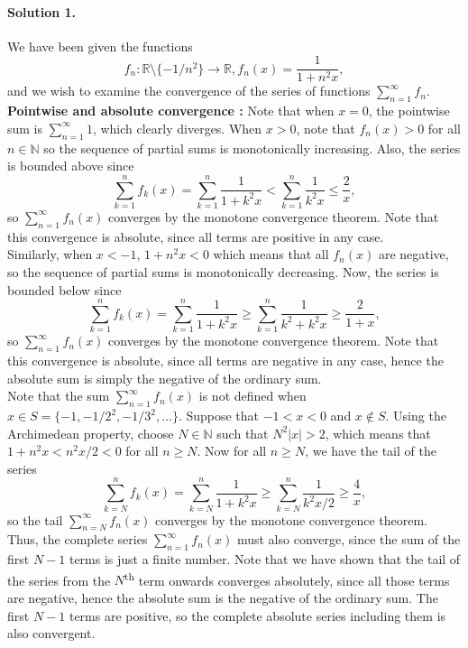 \documentclass[10pt]{article}
\def\R{\mathbb{R}}
\def\N{\mathbb{N}}
\begin{document}
    \paragraph{Solution 1.} We have been given the functions \[
        f_n \colon \R \setminus \{-1 /n^2\} \to \R, f_n(x) = \frac{1}{1 +
        n^2x},
    \] and we wish to examine the convergence of the series of functions $\sum_{n =
    1}^\infty f_n$. \\

    \textbf{Pointwise and absolute convergence : }
    Note that when $x = 0$, the pointwise sum is $\sum_{n = 1}^\infty 1$, which
    clearly diverges. When $x > 0$, note that $f_n(x) > 0$ for all $n \in \N$ so the
    sequence of partial sums is monotonically increasing. Also, the series is
    bounded above since \[
        \sum_{k = 1}^n f_k(x) = \sum_{k = 1}^n \frac{1}{1 + k^2x} < \sum_{k = 1}^n
        \frac{1}{k^2x} \leq \frac{2}{x},
    \] so $\sum_{n = 1}^\infty f_n(x)$ converges by the monotone convergence
    theorem. Note that this convergence is absolute, since all terms are positive
    in any case. \\

    Similarly, when $x < -1$, $1 + n^2x < 0$ which means that all $f_n(x)$ are
    negative, so the sequence of partial sums is monotonically decreasing. Now, the
    series is bounded below since \[
        \sum_{k = 1}^n f_k(x) = \sum_{k = 1}^n \frac{1}{1 + k^2x} \geq \sum_{k = 1}^n
        \frac{1}{k^2 + k^2x} \geq \frac{2}{1 + x},
    \] so $\sum_{n = 1}^\infty f_n(x)$ converges by the monotone convergence
    theorem. Note that this convergence is absolute, since all terms are negative in
    any case, hence the absolute sum is simply the negative of the ordinary sum. \\

    Note that the sum $\sum_{n = 1}^\infty f_n(x)$ is not defined when $x \in S =
    \{-1, -1 /2^2, -1 /3^2, \dots\}$. Suppose that $-1 < x < 0$ and $x \notin S$.
    Using the Archimedean property, choose $N \in \N$ such that $N^2 |x| > 2$, which
    means that $1 + n^2x < n^2 x /2 < 0$ for all $n \geq N$. Now for all $n \geq N$,
    we have the tail of the series \[
        \sum_{k = N}^n f_k(x) = \sum_{k = N}^n \frac{1}{1 + k^2x} \geq \sum_{k =
        N}^n \frac{1}{k^2x /2} \geq \frac{4}{x},
    \] so the tail $\sum_{n = N}^\infty f_n(x)$ converges by the monotone
    convergence theorem. Thus, the complete series $\sum_{n = 1}^\infty f_n(x)$ must
    also converge, since the sum of the first $N - 1$ terms is just a finite number.
    Note that we have shown that the tail of the series from the
    $N$\textsuperscript{th} term onwards converges absolutely, since all those terms
    are negative, hence the absolute sum is the negative of the ordinary sum. The
    first $N - 1$ terms are positive, so the complete absolute series including them
    is also convergent. \\
\end{document}
